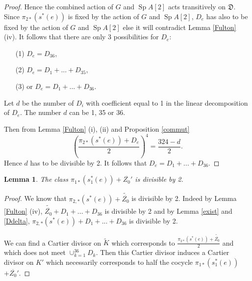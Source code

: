 \documentclass{alggeom}
\DeclareMathOperator{\Sp}{Sp}
\theoremstyle{plain}
\newtheorem{lemme}[theorem]{Lemma}
\theoremstyle{definition}
\theoremstyle{remark}
\begin{document}
\begin{proof}
Hence the combined action of $G$ and $\Sp A[2]$ acts transitively on $\mathfrak{D}$.
Since $\pi_{2*}(s^{*}(e))$ is fixed by the action of $G$ and $\Sp A[2]$, $D_e$ has also to be fixed by the action of $G$ and $\Sp A[2]$ else it will contradict Lemma \ref{Fulton} (iv).
It follows that there are only 3 possibilities for $D_e$: 
\begin{itemize}
\item[(1)]
$D_e=D_{36}$,
\item[(2)]
$D_e=D_1+...+D_{35}$,
\item[(3)]
or $D_e=D_1+...+D_{36}$.
\end{itemize}
Let $d$ be the number of $D_i$ with coefficient equal to 1 in the linear decomposition of $D_e$. The number $d$ can be 1, 35 or 36.

Then from Lemma \ref{Fulton} (i), (ii) and Proposition \ref{commut}
$$\left(\frac{\pi_{2*}(s^{*}(e))+D_e}{2}\right)^4=\frac{324-d}{2}.$$ 
Hence $d$ has to be divisible by 2.
It follows that $D_e=D_1+...+D_{36}$.
\end{proof} 
\begin{lemme}\label{dernierlemme}
The class $\pi_{1*}(s_1^{*}(e))+\overline{Z_{0}}'$ is divisible by 2.
\end{lemme}
\begin{proof}
We know that $\pi_{2,*}(s^{*}(e))+\widetilde{\overline{Z_{0}}}$ is divisible by 2.
Indeed by Lemma \ref{Fulton} (iv), $\widetilde{\overline{Z_{0}}}+D_1+...+D_{36}$ is divisible by 2 and by Lemma \ref{exist} and \ref{Ddelta},
$\pi_{2,*}(s^{*}(e))+D_1+...+D_{36}$ is divisible by 2. 

We can find a Cartier divisor on $\widetilde{K}$ which corresponds to $\frac{\pi_{2*}(s^{*}(e))+\widetilde{\overline{Z_0}}}{2}$ and which does not meet 
$\cup_{k=1}^{36} D_k$.
Then this Cartier divisor induces a Cartier divisor on $K'$ which necessarily corresponds to half the cocycle $\pi_{1*}(s_{1}^{*}(e))$ $+\overline{Z_0}'$.
\end{proof}
\end{document}
